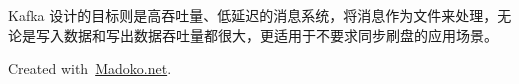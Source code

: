 \documentclass{article}
\begin{document}
\hspace*{1em}\hspace*{1em}Kafka 设计的目标则是高吞吐量、低延迟的消息系统，将消息作为文件来处理，无论是写入数据和写出数据吞吐量都很大，更适用于不要求同步刷盘的应用场景。%

\begin{mdbmargintb}{4em}{}%
\begin{mdflushright}%
{\tiny{}Created with~\href{https://www.madoko.net}{Madoko.net}.}%
\end{mdflushright}%
\end{mdbmargintb}%
\end{document}
